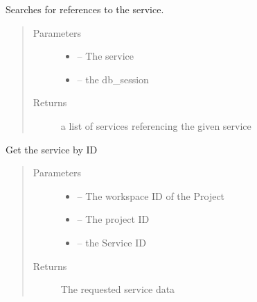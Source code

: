 \documentclass[letterpaper,10pt,english]{sphinxmanual}
\begin{document}

\begin{fulllineitems}
\label{_source/son_editor.impl:son_editor.impl.servicesimpl.get_references}
Searches for references to the service.
\begin{quote}\begin{description}
\item[{Parameters}] \leavevmode\begin{itemize}
\item {} 
 -- The service

\item {} 
 -- the db\_session

\end{itemize}

\item[{Returns}] \leavevmode
a list of services referencing the given service

\end{description}\end{quote}

\end{fulllineitems}


\begin{fulllineitems}
\label{_source/son_editor.impl:son_editor.impl.servicesimpl.get_service}
Get the service by ID
\begin{quote}\begin{description}
\item[{Parameters}] \leavevmode\begin{itemize}
\item {} 
 -- The workspace ID of the Project

\item {} 
 -- The project ID

\item {} 
 -- the Service ID

\end{itemize}

\item[{Returns}] \leavevmode
The requested service data

\end{description}\end{quote}

\end{fulllineitems}
\end{document}
